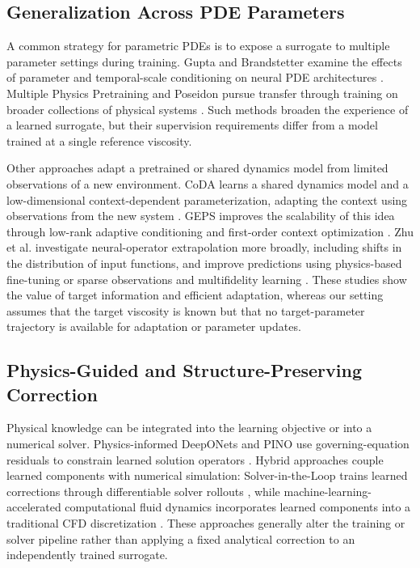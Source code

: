 \documentclass[10pt,twocolumn]{article}
\begin{document}
\subsection{Generalization Across PDE Parameters}

A common strategy for parametric PDEs is to expose a surrogate to multiple parameter settings during training. Gupta and Brandstetter examine the effects of parameter and temporal-scale conditioning on neural PDE architectures \cite{gupta2023multiscale}. Multiple Physics Pretraining and Poseidon pursue transfer through training on broader collections of physical systems \cite{mccabe2024mpp,herde2024poseidon}. Such methods broaden the experience of a learned surrogate, but their supervision requirements differ from a model trained at a single reference viscosity.

Other approaches adapt a pretrained or shared dynamics model from limited observations of a new environment. CoDA learns a shared dynamics model and a low-dimensional context-dependent parameterization, adapting the context using observations from the new system \cite{kirchmeyer2022coda}. GEPS improves the scalability of this idea through low-rank adaptive conditioning and first-order context optimization \cite{koupai2024geps}. Zhu et al. investigate neural-operator extrapolation more broadly, including shifts in the distribution of input functions, and improve predictions using physics-based fine-tuning or sparse observations and multifidelity learning \cite{zhu2023extrapolation}. These studies show the value of target information and efficient adaptation, whereas our setting assumes that the target viscosity is known but that no target-parameter trajectory is available for adaptation or parameter updates.

\subsection{Physics-Guided and Structure-Preserving Correction}

Physical knowledge can be integrated into the learning objective or into a numerical solver. Physics-informed DeepONets and PINO use governing-equation residuals to constrain learned solution operators \cite{wang2021physicsdeeponet,li2024pino}. Hybrid approaches couple learned components with numerical simulation: Solver-in-the-Loop trains learned corrections through differentiable solver rollouts \cite{um2020solverintheloop}, while machine-learning-accelerated computational fluid dynamics incorporates learned components into a traditional CFD discretization \cite{kochkov2021mlcfd}. These approaches generally alter the training or solver pipeline rather than applying a fixed analytical correction to an independently trained surrogate.
\end{document}
